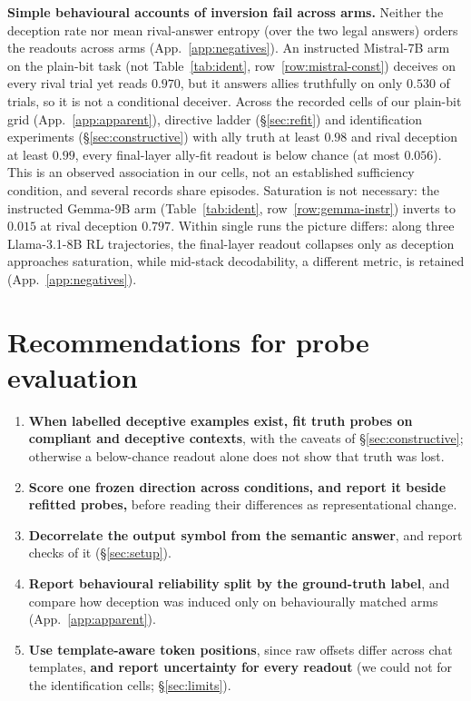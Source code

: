 \documentclass{article}
\begin{document}
\textbf{Simple behavioural accounts of inversion fail across arms.} Neither the deception rate nor mean rival-answer entropy (over the two legal answers) orders the readouts across arms (App.~\ref{app:negatives}). An instructed Mistral-7B arm on the plain-bit task (not Table~\ref{tab:ident}, row~\ref{row:mistral-const}) deceives on every rival trial yet reads $0.970$, but it answers allies truthfully on only $0.530$ of trials, so it is not a conditional deceiver. Across the recorded cells of our plain-bit grid (App.~\ref{app:apparent}), directive ladder (\S\ref{sec:refit}) and identification experiments (\S\ref{sec:constructive}) with ally truth at least $0.98$ and rival deception at least $0.99$, every final-layer ally-fit readout is below chance (at most $0.056$). This is an observed association in our cells, not an established sufficiency condition, and several records share episodes. Saturation is not necessary: the instructed Gemma-9B arm (Table~\ref{tab:ident}, row~\ref{row:gemma-instr}) inverts to $0.015$ at rival deception $0.797$. Within single runs the picture differs: along three Llama-3.1-8B RL trajectories, the final-layer readout collapses only as deception approaches saturation, while mid-stack decodability, a different metric, is retained (App.~\ref{app:negatives}).

\section{Recommendations for probe evaluation}
\label{sec:recs}

{\setlength{\leftmargini}{1.3em}
\begin{enumerate}\itemsep1pt \parskip0pt 
\item \textbf{When labelled deceptive examples exist, fit truth probes on compliant and deceptive contexts}, with the caveats of \S\ref{sec:constructive}; otherwise a below-chance readout alone does not show that truth was lost.
\item \textbf{Score one frozen direction across conditions, and report it beside refitted probes,} before reading their differences as representational change.
\item \textbf{Decorrelate the output symbol from the semantic answer}, and report checks of it (\S\ref{sec:setup}).
\item \textbf{Report behavioural reliability split by the ground-truth label}, and compare how deception was induced only on behaviourally matched arms (App.~\ref{app:apparent}).
\item \textbf{Use template-aware token positions}, since raw offsets differ across chat templates, \textbf{and report uncertainty for every readout} (we could not for the identification cells; \S\ref{sec:limits}).
\end{enumerate}}
\end{document}

